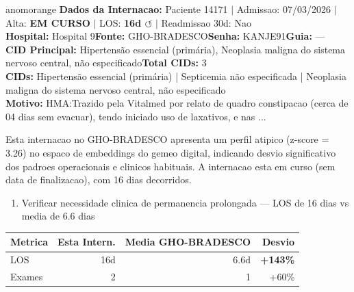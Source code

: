 \documentclass[a4paper,10pt]{article}
\begin{document}
\begin{anomalycard}[Internacao 120486 | GHO-BRADESCO | ALTO (z=3.26)]{anomorange}
\textbf{Dados da Internacao:} Paciente 14171 $\mid$ Admissao: 07/03/2026 $\mid$ Alta: \textcolor{anomorange}{\textbf{EM CURSO}} $\mid$ LOS: \textbf{16d \textcolor{anomorange}{$\circlearrowleft$}} $\mid$ Readmissao 30d: Nao\\
\textbf{Hospital:} Hospital 9\quad\textbf{Fonte:} GHO-BRADESCO\quad\textbf{Senha:} KANJE91\quad\textbf{Guia:} ---\\
\textbf{CID Principal:} {\small Hipertensão essencial (primária), Neoplasia maligna do sistema nervoso central, não especificado}\quad\textbf{Total CIDs:} 3\\

\textbf{CIDs:} {\scriptsize Hipertensão essencial (primária) | Septicemia não especificada | Neoplasia maligna do sistema nervoso central, não especificado}\\

\textbf{Motivo:} {\scriptsize HMA:Trazido pela Vitalmed por relato de quadro constipacao (cerca de 04 dias sem evacuar), tendo iniciado uso de laxativos, e nas ...}\\

\vspace{2pt}\begin{tcolorbox}[colback=severityred!20,colframe=anomorange,title={\textbf{Interpretacao de Negocio}},fonttitle=\bfseries\small,left=4pt,right=4pt,top=3pt,bottom=3pt]
{\small Esta internacao no GHO-BRADESCO apresenta um perfil atipico (z-score = 3.26) no espaco de embeddings do gemeo digital, indicando desvio significativo dos padroes operacionais e clinicos habituais. A internacao esta em curso (sem data de finalizacao), com 16 dias decorridos.}
\end{tcolorbox}
\begin{tcolorbox}[colback=severityyellow!30,colframe=anomorange,title={\textbf{Recomendacoes Especificas}},fonttitle=\bfseries\small,left=4pt,right=4pt,top=3pt,bottom=3pt]
\begin{enumerate}[nosep,leftmargin=16pt]
\item {\small Verificar necessidade clinica de permanencia prolongada --- LOS de 16 dias vs media de 6.6 dias}
\end{enumerate}
\end{tcolorbox}
\begin{center}\begin{tabular}{l r r r}\toprule\textbf{Metrica} & \textbf{Esta Intern.} & \textbf{Media GHO-BRADESCO} & \textbf{Desvio} \\\midrule
LOS & 16d & 6.6d & \textcolor{anomred}{\textbf{+143\%}} \\
Exames & 2 & 1 & \textcolor{anomorange}{+60\%} \\
\bottomrule\end{tabular}\end{center}


\end{anomalycard}
\end{document}
